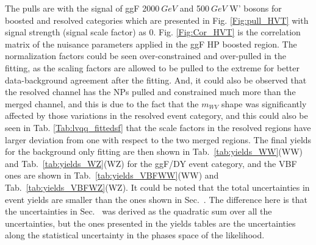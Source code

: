 The pulls are with the signal of ggF 2000$~GeV$ and 500$~GeV$ W' bosons for boosted and resolved categories which are presented in Fig. \ref{Fig:pull_HVT} with signal strength (signal scale factor) as 0. Fig. \ref{Fig:Cor_HVT} is the correlation matrix of the nuisance parameters applied in the ggF HP boosted region. The normalization factors could be seen over-constrained and over-pulled in the fitting, as the scaling factors are allowed to be pulled to the extreme for better data-background agreement after the fitting. And, it could also be observed that the resolved channel has the NPs pulled and constrained much more than the merged channel, and this is due to the fact that the $m_{WV}$ shape was significantly affected by those variations in the resolved event category, and this could also be seen in Tab. \ref{Tab:lvqq_fittedsf} that the scale factors in the resolved regions have larger deviation from one with respect to the two merged regions. The final yields for the background only fitting are then shown in Tab.~\ref{tab:yields_WW}(WW) and Tab.~\ref{tab:yields_WZ}(WZ) for the ggF/DY event category, and the VBF ones are shown in Tab.~\ref{tab:yields_VBFWW}(WW) and Tab.~\ref{tab:yields_VBFWZ}(WZ). It could be noted that the total uncertainties in event yields are smaller than the ones shown in Sec.~\label{Sec:data_bkg_compar}. The difference here is that the uncertainties in Sec.~\label{Sec:data_bkg_compar} was derived as the quadratic sum over all the uncertainties, but the ones presented in the yields tables are the uncertainties along the statistical uncertainty in the phases space of the likelihood.  
